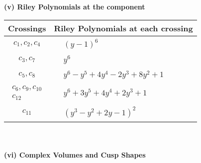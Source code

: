 \documentclass[1p]{elsarticle_modified}
\theoremstyle{definition}
\begin{document}
\newpage\renewcommand{\arraystretch}{1}
\flushleft \textbf{(v) Riley Polynomials at the component}\newline \\
\begin{tabular}{m{50pt}|m{274pt}}
Crossings & \hspace{64pt}Riley Polynomials at each crossing \\
\hline $$\begin{aligned}c_{1},c_{2},c_{4}\end{aligned}$$&$\begin{aligned}
&(y-1)^6
\end{aligned}$\\
\hline $$\begin{aligned}c_{3},c_{7}\end{aligned}$$&$\begin{aligned}
&y^6
\end{aligned}$\\
\hline $$\begin{aligned}c_{5},c_{8}\end{aligned}$$&$\begin{aligned}
&y^6- y^5+4 y^4-2 y^3+8 y^2+1
\end{aligned}$\\
\hline $$\begin{aligned}c_{6},c_{9},c_{10}\\c_{12}\end{aligned}$$&$\begin{aligned}
&y^6+3 y^5+4 y^4+2 y^3+1
\end{aligned}$\\
\hline $$\begin{aligned}c_{11}\end{aligned}$$&$\begin{aligned}
&(y^3- y^2+2 y-1)^2
\end{aligned}$\\
\hline
\end{tabular}\\~\\
\newpage\flushleft \textbf{(vi) Complex Volumes and Cusp Shapes}
\end{document}
